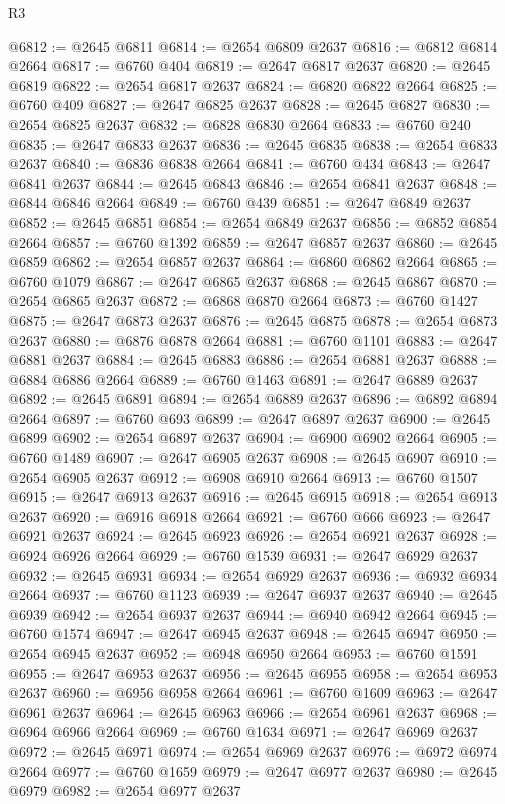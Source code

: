 \begin{lexlean}{R3}
\begin{coremodule}
@6812 := @2645 @6811
@6814 := @2654 @6809 @2637
@6816 := @6812 @6814 @2664
@6817 := @6760 @404
@6819 := @2647 @6817 @2637
@6820 := @2645 @6819
@6822 := @2654 @6817 @2637
@6824 := @6820 @6822 @2664
@6825 := @6760 @409
@6827 := @2647 @6825 @2637
@6828 := @2645 @6827
@6830 := @2654 @6825 @2637
@6832 := @6828 @6830 @2664
@6833 := @6760 @240
@6835 := @2647 @6833 @2637
@6836 := @2645 @6835
@6838 := @2654 @6833 @2637
@6840 := @6836 @6838 @2664
@6841 := @6760 @434
@6843 := @2647 @6841 @2637
@6844 := @2645 @6843
@6846 := @2654 @6841 @2637
@6848 := @6844 @6846 @2664
@6849 := @6760 @439
@6851 := @2647 @6849 @2637
@6852 := @2645 @6851
@6854 := @2654 @6849 @2637
@6856 := @6852 @6854 @2664
@6857 := @6760 @1392
@6859 := @2647 @6857 @2637
@6860 := @2645 @6859
@6862 := @2654 @6857 @2637
@6864 := @6860 @6862 @2664
@6865 := @6760 @1079
@6867 := @2647 @6865 @2637
@6868 := @2645 @6867
@6870 := @2654 @6865 @2637
@6872 := @6868 @6870 @2664
@6873 := @6760 @1427
@6875 := @2647 @6873 @2637
@6876 := @2645 @6875
@6878 := @2654 @6873 @2637
@6880 := @6876 @6878 @2664
@6881 := @6760 @1101
@6883 := @2647 @6881 @2637
@6884 := @2645 @6883
@6886 := @2654 @6881 @2637
@6888 := @6884 @6886 @2664
@6889 := @6760 @1463
@6891 := @2647 @6889 @2637
@6892 := @2645 @6891
@6894 := @2654 @6889 @2637
@6896 := @6892 @6894 @2664
@6897 := @6760 @693
@6899 := @2647 @6897 @2637
@6900 := @2645 @6899
@6902 := @2654 @6897 @2637
@6904 := @6900 @6902 @2664
@6905 := @6760 @1489
@6907 := @2647 @6905 @2637
@6908 := @2645 @6907
@6910 := @2654 @6905 @2637
@6912 := @6908 @6910 @2664
@6913 := @6760 @1507
@6915 := @2647 @6913 @2637
@6916 := @2645 @6915
@6918 := @2654 @6913 @2637
@6920 := @6916 @6918 @2664
@6921 := @6760 @666
@6923 := @2647 @6921 @2637
@6924 := @2645 @6923
@6926 := @2654 @6921 @2637
@6928 := @6924 @6926 @2664
@6929 := @6760 @1539
@6931 := @2647 @6929 @2637
@6932 := @2645 @6931
@6934 := @2654 @6929 @2637
@6936 := @6932 @6934 @2664
@6937 := @6760 @1123
@6939 := @2647 @6937 @2637
@6940 := @2645 @6939
@6942 := @2654 @6937 @2637
@6944 := @6940 @6942 @2664
@6945 := @6760 @1574
@6947 := @2647 @6945 @2637
@6948 := @2645 @6947
@6950 := @2654 @6945 @2637
@6952 := @6948 @6950 @2664
@6953 := @6760 @1591
@6955 := @2647 @6953 @2637
@6956 := @2645 @6955
@6958 := @2654 @6953 @2637
@6960 := @6956 @6958 @2664
@6961 := @6760 @1609
@6963 := @2647 @6961 @2637
@6964 := @2645 @6963
@6966 := @2654 @6961 @2637
@6968 := @6964 @6966 @2664
@6969 := @6760 @1634
@6971 := @2647 @6969 @2637
@6972 := @2645 @6971
@6974 := @2654 @6969 @2637
@6976 := @6972 @6974 @2664
@6977 := @6760 @1659
@6979 := @2647 @6977 @2637
@6980 := @2645 @6979
@6982 := @2654 @6977 @2637

\end{coremodule}
\end{lexlean}
